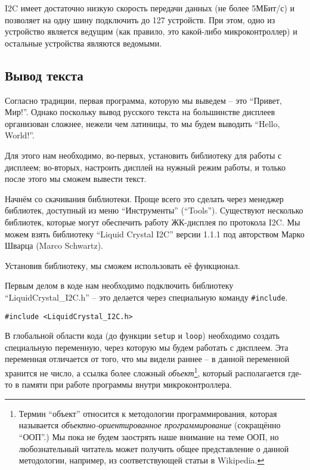 \documentclass[../sparc.tex]{subfiles}
\begin{document}
\gls{I2C} имеет достаточно низкую скорость передачи данных (не более 5МБит/с) и
позволяет на одну шину подключить до 127 устройств.  При этом, одно из
устройство является ведущим (как правило, это какой-либо микроконтроллер) и
остальные устройства являются ведомыми.

\subsection{Вывод текста}


Согласно традиции, первая программа, которую мы выведем -- это ``Привет, Мир!''.
Однако поскольку вывод русского текста на большинстве дисплеев организован
сложнее, нежели чем латиницы, то мы будем выводить ``Hello, World!''.

Для этого нам необходимо, во-первых, установить библиотеку для работы с
дисплеем; во-вторых, настроить дисплей на нужный режим работы, и только после
этого мы сможем вывести текст.

Начнём со скачивания библиотеки.  Проще всего это сделать через менеджер
библиотек, доступный из меню ``Инструменты'' (``Tools'').  Существуют несколько
библиотек, которые могут обеспечить работу ЖК-дисплея по протокола I2C.  Мы
можем взять библиотеку ``Liquid Crystal I2C'' версии 1.1.1 под авторством Марко
Шварца (Marco Schwartz).

Установив библиотеку, мы сможем использовать её функционал.

Первым делом в коде нам необходимо подключить библиотеку
``LiquidCrystal\_I2C.h'' -- это делается через специальную команду
\texttt{\#include}.

\begin{verbatim}
#include <LiquidCrystal_I2C.h>
\end{verbatim}

В глобальной области кода (до функции \texttt{setup} и \texttt{loop}) необходимо
создать специальную переменную, через которую мы будем работать с дисплеем. Эта
переменная отличается от того, что мы видели раннее -- в данной переменной
хранится не число, а ссылка более сложный \emph{объект}\footnote{Термин
``объект'' относится к методологии программирования, которая называется
\emph{объектно-ориентированное программирование} (сокращённо ``ООП''.)  Мы пока
не будем заострять наше внимание на теме ООП, но любознательный читатель может
получить общее представление о данной методологии, например, из соответствующей
статьи в Wikipedia.}, который располагается где-то в памяти при работе программы
внутри микроконтроллера.
\end{document}
